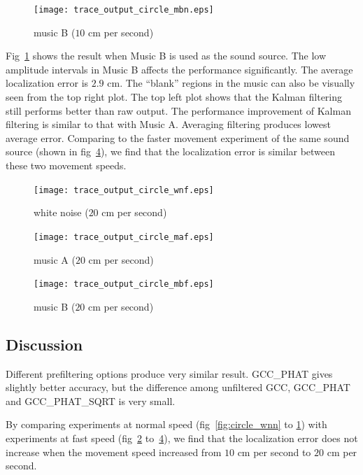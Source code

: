 \begin{figure}[h!]
\centering
\texttt{[image: trace\_output\_circle\_mbn.eps]}
\caption{music B ($10$ cm per second)}
\label{fig:circle_musicbn}
\end{figure}

Fig~\ref{fig:circle_musicbn} shows the result when Music B is used as the sound source.  The low amplitude intervals in Music B affects the performance significantly. The average localization error is $2.9$ cm. The ``blank'' regions in the music can also be visually seen from the top right plot. The top left plot shows that the Kalman filtering still performs better than raw output. The performance improvement of Kalman filtering is similar to that with Music A. Averaging filtering produces lowest average error. Comparing to the faster movement experiment of the same sound source (shown in fig~\ref{fig:circle_musicbf}), we find that the localization error is similar between these two movement speeds.

\begin{figure}[h!]
\centering
\texttt{[image: trace\_output\_circle\_wnf.eps]}
\caption{white noise ($20$ cm per second)}
\label{fig:circle_wnf}
\end{figure}

\begin{figure}[h!]
\centering
  \texttt{[image: trace\_output\_circle\_maf.eps]}
  \caption{music A ($20$ cm per second)}
  \label{fig:circle_musicaf}
\end{figure}

\begin{figure}[h!]
\centering
  \texttt{[image: trace\_output\_circle\_mbf.eps]}
  \caption{music B ($20$ cm per second)}
  \label{fig:circle_musicbf}
\end{figure}

\subsection{Discussion}

Different prefiltering options produce very similar result. GCC\_PHAT gives slightly better accuracy, but the difference among unfiltered GCC, GCC\_PHAT and GCC\_PHAT\_SQRT is very small.

By comparing experiments at normal speed (fig~\ref{fig:circle_wnn} to \ref{fig:circle_musicbn}) with experiments at fast speed (fig~\ref{fig:circle_wnf} to~\ref{fig:circle_musicbf}), we find that the localization error does not increase when the movement speed increased from $10$ cm per second to $20$ cm per second.

